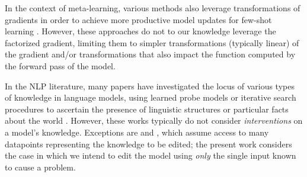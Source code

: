 \documentclass{article}
\begin{document}
In the context of meta-learning, various methods also leverage transformations of gradients in order to achieve more productive model updates for few-shot learning \citep{li2017metasgd,lee2018gradient,park2019meta,Flennerhag2020Meta-Learning}.
However, these approaches do not to our knowledge leverage the factorized gradient, limiting them to simpler transformations (typically linear) of the gradient and/or transformations that also impact the function computed by the forward pass of the model.

In the NLP literature, many papers have investigated the locus of various types of knowledge in language models, using learned probe models or iterative search procedures to ascertain the presence of linguistic structures \citep{belinkov-etal-2017-neural,conneau-etal-2018-cram,hewitt-manning-2019-structural} or particular facts about the world \cite{petroni-etal-2019-language,Jiang2020HowCW,dai2021knowledge}. However, these works typically do not consider \textit{interventions} on a model's knowledge. Exceptions are \cite{dai2021knowledge} and \cite{wang2020kadapter}, which assume access to many datapoints representing the knowledge to be edited; the present work considers the case in which we intend to edit the model using \textit{only} the single input known to cause a problem.
\end{document}
